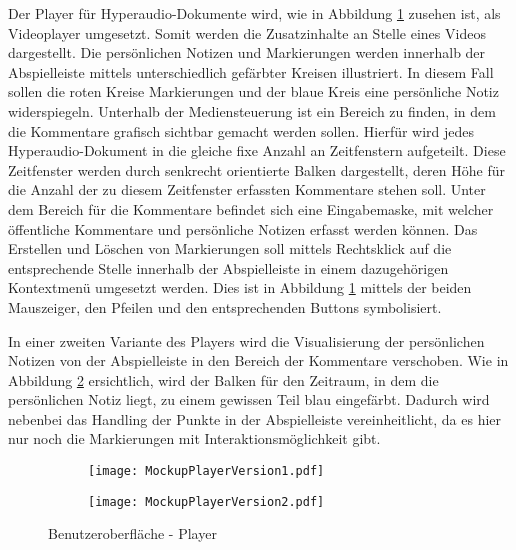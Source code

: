 Der Player für Hyperaudio-Dokumente wird, wie in Abbildung \ref{fig:MockupPlayerVersion1} zusehen ist, als Videoplayer umgesetzt. Somit werden die Zusatzinhalte an Stelle eines Videos dargestellt. Die persönlichen Notizen und Markierungen werden innerhalb der Abspielleiste mittels unterschiedlich gefärbter Kreisen illustriert. In diesem Fall sollen die roten Kreise Markierungen und der blaue Kreis eine persönliche Notiz widerspiegeln. Unterhalb der Mediensteuerung ist ein Bereich zu finden, in dem die Kommentare grafisch sichtbar gemacht werden sollen. Hierfür wird jedes Hyperaudio-Dokument in die gleiche fixe Anzahl an Zeitfenstern aufgeteilt. Diese Zeitfenster werden durch senkrecht orientierte Balken dargestellt, deren Höhe für die Anzahl der zu diesem Zeitfenster erfassten Kommentare stehen soll. Unter dem Bereich für die Kommentare befindet sich eine Eingabemaske, mit welcher öffentliche Kommentare und persönliche Notizen erfasst werden können. Das Erstellen und Löschen von Markierungen soll mittels Rechtsklick auf die entsprechende Stelle innerhalb der Abspielleiste in einem dazugehörigen Kontextmenü umgesetzt werden. Dies ist in Abbildung \ref{fig:MockupPlayerVersion1} mittels der beiden Mauszeiger, den Pfeilen und den entsprechenden Buttons symbolisiert.



In einer zweiten Variante des Players wird die Visualisierung der persönlichen Notizen von der Abspielleiste in den Bereich der Kommentare verschoben. Wie in Abbildung \ref{fig:MockupPlayerVersion2} ersichtlich,  wird der Balken für den Zeitraum, in dem die persönlichen Notiz liegt, zu einem gewissen Teil blau eingefärbt. Dadurch wird nebenbei das Handling der Punkte in der Abspielleiste vereinheitlicht, da es hier nur noch die Markierungen mit Interaktionsmöglichkeit gibt.

\begin{figure}[h!]
\begin{subfigure}[c]{\textwidth}
\texttt{[image: MockupPlayerVersion1.pdf]}
\label{fig:MockupPlayerVersion1}
\end{subfigure}
\par\bigskip
\begin{subfigure}[c]{\textwidth}
\texttt{[image: MockupPlayerVersion2.pdf]}
\label{fig:MockupPlayerVersion2}
\end{subfigure}
\caption{Benutzeroberfläche - Player}
\label{fig:MockupPlayerVersion}
\end{figure}

